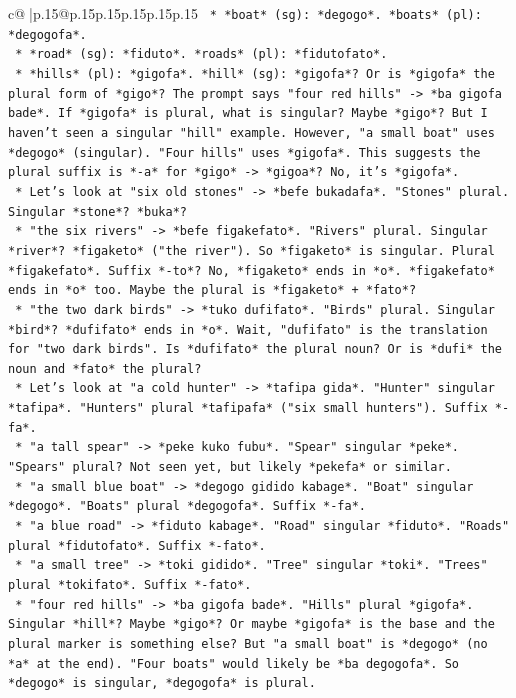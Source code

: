 \documentclass{article}
\begin{document}
{\begin{supertabular}{c@{$\;$}|p{.15\linewidth}@{}p{.15\linewidth}p{.15\linewidth}p{.15\linewidth}p{.15\linewidth}p{.15\linewidth}}
{{{\texttt{        *   *boat* (sg): *degogo*. *boats* (pl): *degogofa*.} \\
\texttt{        *   *road* (sg): *fiduto*. *roads* (pl): *fidutofato*.} \\
\texttt{        *   *hills* (pl): *gigofa*. *hill* (sg): *gigofa*? Or is *gigofa* the plural form of *gigo*? The prompt says "four red hills" {-}> *ba gigofa bade*. If *gigofa* is plural, what is singular? Maybe *gigo*? But I haven't seen a singular "hill" example. However, "a small boat" uses *degogo* (singular). "Four hills" uses *gigofa*. This suggests the plural suffix is *{-}a* for *gigo* {-}> *gigoa*? No, it's *gigofa*.} \\
\texttt{        *   Let's look at "six old stones" {-}> *befe bukadafa*. "Stones" plural. Singular *stone*? *buka*?} \\
\texttt{        *   "the six rivers" {-}> *befe figakefato*. "Rivers" plural. Singular *river*? *figaketo* ("the river"). So *figaketo* is singular. Plural *figakefato*. Suffix *{-}to*? No, *figaketo* ends in *o*. *figakefato* ends in *o* too. Maybe the plural is *figaketo* + *fato*?} \\
\texttt{        *   "the two dark birds" {-}> *tuko dufifato*. "Birds" plural. Singular *bird*? *dufifato* ends in *o*. Wait, "dufifato" is the translation for "two dark birds". Is *dufifato* the plural noun? Or is *dufi* the noun and *fato* the plural?} \\
\texttt{        *   Let's look at "a cold hunter" {-}> *tafipa gida*. "Hunter" singular *tafipa*. "Hunters" plural *tafipafa* ("six small hunters"). Suffix *{-}fa*.} \\
\texttt{        *   "a tall spear" {-}> *peke kuko fubu*. "Spear" singular *peke*. "Spears" plural? Not seen yet, but likely *pekefa* or similar.} \\
\texttt{        *   "a small blue boat" {-}> *degogo gidido kabage*. "Boat" singular *degogo*. "Boats" plural *degogofa*. Suffix *{-}fa*.} \\
\texttt{        *   "a blue road" {-}> *fiduto kabage*. "Road" singular *fiduto*. "Roads" plural *fidutofato*. Suffix *{-}fato*.} \\
\texttt{        *   "a small tree" {-}> *toki gidido*. "Tree" singular *toki*. "Trees" plural *tokifato*. Suffix *{-}fato*.} \\
\texttt{        *   "four red hills" {-}> *ba gigofa bade*. "Hills" plural *gigofa*. Singular *hill*? Maybe *gigo*? Or maybe *gigofa* is the base and the plural marker is something else? But "a small boat" is *degogo* (no *a* at the end). "Four boats" would likely be *ba degogofa*. So *degogo* is singular, *degogofa* is plural.} \\
}}}
\end{supertabular}}
\end{document}
